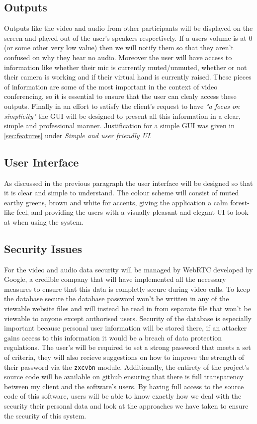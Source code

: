 \subsection{Outputs}

Outputs like the video and audio from other participants will 
be displayed on the screen and played out of the user's 
speakers respectively. If a users volume is at 0 (or some 
other very low value) then we will 
notify them so that they aren't confused on why they hear no 
audio. Moreover the user will have access to 
information like whether their mic is currently muted/unmuted,
whether or not their camera is working and if their virtual 
hand is currently raised. These pieces of information are
some of the most important in the context of video
conferencing, so it is essential to ensure that the user can 
clealy access these outputs. Finally in an effort to satisfy
the client's request to have \textit{"a focus on simplicity"}
the GUI will be designed to present all this information in a
clear, simple and professional manner. Justification for a
simple GUI was given in \ref{sec:features} under 
\textit{Simple and user friendly UI}.

\subsection{User Interface}

As discussed in the previous paragraph the user interface will
be designed so that it is clear and simple to understand. The 
colour scheme will consist of muted earthy greens, brown and
white for accents, giving the application a calm forest-like 
feel, and providing the users with a visually pleasant and 
elegant UI to look at when using the system.

\subsection{Security Issues}

For the video and audio data security will be managed by 
WebRTC developed by Google, a credible company that will have
implemented all the necessary measures to ensure that this
data is completly secure during video calls. To keep the 
database secure the database password won't be written in any
of the viewable website files and will instead be read in from
separate file that won't be viewable to anyone except 
authorised users. Security of the database is especially 
important because personal user information will be stored 
there, if an attacker gains access to this information it 
would be a breach of data protection regulations. 
The user's will be required to set a strong password that 
meets a set of criteria, they will also recieve suggestions
on how to improve the strength of their password via the 
\texttt{zxcvbn} module. Additionally, the entirety of the
project's source code will be available on github 
ensuring that there is full transparency between my client 
and the software's users. By having full access to the source
code of this software, users will be able to know exactly how
we deal with the security their personal data and look at the 
approaches we have taken to ensure the security of this
system. 

